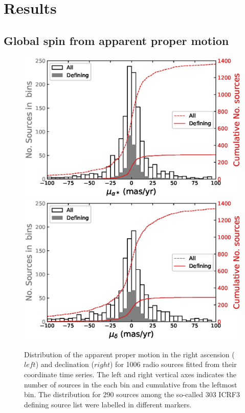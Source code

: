 \documentclass{aa}
\begin{document}

\section{Results}  \label{sec:results}


\subsection{Global spin from apparent proper motion}  \label{subsec:spin-from-apm}

    \begin{figure}
        \label{fig:apm-dist}%
        \centering
        \includegraphics[width=\columnwidth]{figs/pmra-hist-glo}
        \includegraphics[width=\columnwidth]{figs/pmdec-hist-glo}
        \caption{Distribution of the apparent proper motion in the right ascension ($left$) and declination ($right$) for 1006 radio sources fitted from their coordinate time series.
            The left and right vertical axes indicates the number of sources in the each bin and cumulative from the leftmost bin.
            The distribution for 290 sources among the so-called 303 ICRF3 defining source list were labelled in different markers.}
    \end{figure}
\end{document}
